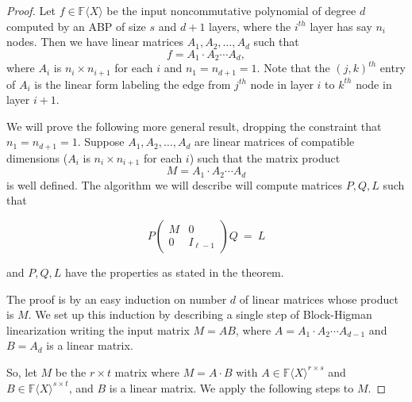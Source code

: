 \documentclass[10pt,a4paper]{article}
\newcommand{\F}{\mathbb{F}}
\renewcommand{\angle}[1]{\langle #1 \rangle}
\newcommand{\FX}{\F\angle{X}}
\newcommand{\fR}{\FX}
\begin{document}
\begin{proof}
  Let $f\in \fR$ be the input noncommutative polynomial of degree $d$
  computed by an ABP of size $s$ and $d+1$ layers, where the $i^{th}$
  layer has say $n_i$ nodes. Then we have linear matrices
  $A_1,A_2,\ldots,A_d$ such that
  \[
    f=A_1\cdot A_2\cdots A_d,
  \]
  where $A_i$ is $n_i\times n_{i+1}$ for each $i$ and $n_1=n_{d+1}=1$.
  Note that the $(j,k)^{th}$ entry of $A_i$ is the linear form
  labeling the edge from $j^{th}$ node in layer $i$ to $k^{th}$
  node in layer $i+1$.

  We will prove the following more general result, dropping the
  constraint that $n_1=n_{d+1}=1$. Suppose $A_1,A_2,\ldots,A_d$ are
  linear matrices of compatible dimensions ($A_i$ is
  $n_i\times n_{i+1}$ for each $i$) such that the matrix product
\[
  M=A_1\cdot A_2\cdots A_d
\]  
is well defined. The algorithm we will describe will compute matrices
$P, Q, L$ such that

\begin{equation}\label{higeq-block-product}
%
P\left(
\begin{array}{c|c}
M & 0 \\
\hline
0 & I_{\ell-1}
\end{array}
\right)Q ~=~L
\end{equation}

and $P, Q, L$ have the properties as stated in the theorem.

%

%
%

The proof is by an easy induction on number $d$ of linear matrices
whose product is $M$. We set up this induction by describing a single
step of Block-Higman linearization writing the input matrix $M=AB$,
where $A=A_1\cdot A_2\cdots A_{d-1}$ and $B=A_d$ is a linear matrix.

So, let $M$ be the $r \times t$ matrix where $M=A\cdot B$ with
$A \in \fR^{r\times s}$ and $B \in \fR^{s\times t}$, and $B$ is a linear
matrix. We apply the following steps to $M$.


\end{proof}
\end{document}
